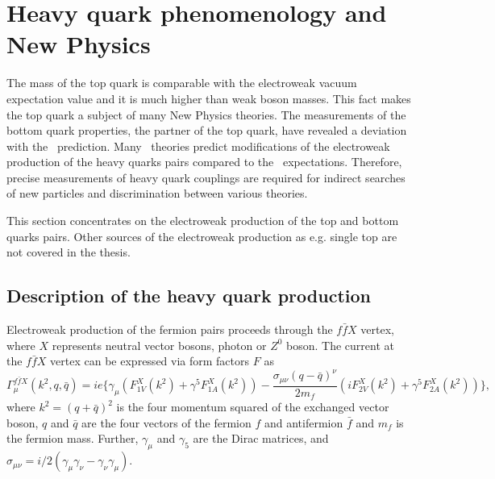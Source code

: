
\section{Heavy quark phenomenology and New Physics}
\label{sec:Phenomenology}
The mass of the top quark is comparable with the electroweak vacuum expectation value and it is much higher than weak boson masses. 
This fact makes the top quark a subject of many New Physics theories. 
The measurements of the bottom quark properties, the partner of the top quark, have revealed a deviation with the \sm\ prediction. 
Many \bsm\ theories predict modifications of the electroweak production of the heavy quarks pairs compared to the \sm\ expectations. 
Therefore, precise measurements of heavy quark couplings are required for indirect searches of new particles and discrimination between various theories. 

This section concentrates on the electroweak production of the top and bottom quarks pairs.%
Other sources of the electroweak production as e.g. single top are not covered in the thesis. 


\subsection{Description of the heavy quark production}
Electroweak production of the fermion pairs proceeds through the $f\bar{f}X$ vertex, where $X$ represents neutral vector bosons, photon or $Z^0$ boson.  The current at the $f\bar{f}X$ vertex can be expressed via form factors $F$ as 
\begin{equation}
\Gamma^{f\bar{f}X}_\mu (k^2,q,\bar{q}) = ie\{ \gamma_\mu (F^X_{1V}(k^2) + \gamma^5 F^X_{1A}(k^2)) - \frac{\sigma_{\mu\nu}(q-\bar{q})^\nu}{2m_f}(iF^X_{2V}(k^2) + \gamma^5 F^X_{2A}(k^2)) \},
\end{equation}
where $k^2= (q+\bar{q})^2$ is the four momentum squared of the exchanged vector boson, $q$ and $\bar{q}$ are the four vectors of the fermion $f$ and antifermion $\bar{f}$ and $m_f$ is the fermion mass. Further, $\gamma_\mu$ and $\gamma_5$ are the Dirac matrices, and $\sigma_{\mu\nu} = i/2(\gamma_\mu\gamma_\nu - \gamma_\nu\gamma_\mu)$.

